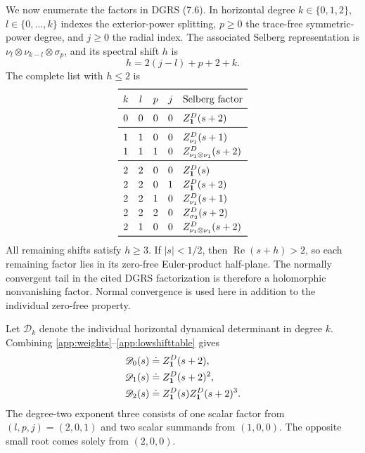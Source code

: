 \documentclass[11pt,letterpaper,reqno]{amsart}
\theoremstyle{remark}
\begin{document}
We now enumerate the factors in DGRS (7.6). In horizontal degree
$k\in\{0,1,2\}$, $l\in\{0,\ldots,k\}$ indexes the exterior-power
splitting, $p\geq0$ the trace-free symmetric-power degree, and $j\geq0$
the radial index. The associated Selberg representation is
$\nu_l\otimes\nu_{k-l}\otimes\sigma_p$, and its spectral shift $h$ is
\begin{equation}\label{app:shift}
 h=2(j-l)+p+2+k.
\end{equation}
The complete list with $h\leq2$ is
\begin{equation}\label{app:lowshifttable}
\renewcommand{\arraystretch}{1.2}
\begin{array}{ccccl}
 \toprule
 k&l&p&j&\text{Selberg factor}\\ \midrule
 0&0&0&0&Z^D_{\mathbf1}(s+2)\\ \midrule
 1&1&0&0&Z^D_{\nu_1}(s+1)\\
 1&1&1&0&Z^D_{\nu_1\otimes\nu_1}(s+2)\\ \midrule
 2&2&0&0&Z^D_{\mathbf1}(s)\\
 2&2&0&1&Z^D_{\mathbf1}(s+2)\\
 2&2&1&0&Z^D_{\nu_1}(s+1)\\
 2&2&2&0&Z^D_{\sigma_2}(s+2)\\
 2&1&0&0&Z^D_{\nu_1\otimes\nu_1}(s+2)\\ \bottomrule
\end{array}
\end{equation}
All remaining shifts satisfy $h\geq3$. If $|s|<1/2$, then
$\operatorname{Re}(s+h)>2$, so each remaining factor lies in its
zero-free Euler-product half-plane. The normally convergent tail in
the cited DGRS factorization is therefore a holomorphic nonvanishing
factor. Normal convergence is used here in addition to the individual
zero-free property.

Let $\mathscr D_k$ denote the individual horizontal dynamical
determinant in degree $k$. Combining
\eqref{app:weights}--\eqref{app:lowshifttable} gives
\begin{align}\label{app:individualdivisors}
 \mathscr D_0(s)&\doteq Z^D_{\mathbf1}(s+2),\notag\\
 \mathscr D_1(s)&\doteq Z^D_{\mathbf1}(s+2)^2,\notag\\
 \mathscr D_2(s)&\doteq
      Z^D_{\mathbf1}(s)Z^D_{\mathbf1}(s+2)^3.
\end{align}
The degree-two exponent three consists of one scalar factor from
$(l,p,j)=(2,0,1)$ and two scalar summands from $(1,0,0)$.
The opposite small root comes solely from $(2,0,0)$.
\end{document}

